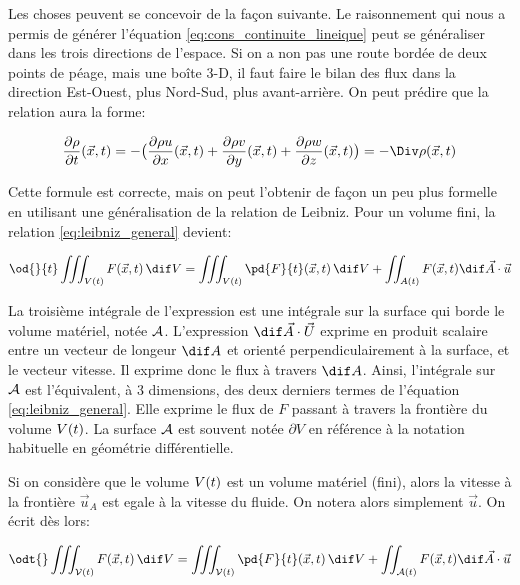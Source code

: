 Les choses peuvent se concevoir de la façon suivante. Le raisonnement qui nous a permis de générer l'équation \eqref{eq:cons_continuite_lineique} peut se généraliser dans les trois directions de l'espace. Si on a non pas une route bordée de deux points de péage, mais une boîte 3-D, il faut faire le bilan des flux dans la direction Est-Ouest, plus Nord-Sud, plus avant-arrière. On peut prédire que la relation aura la forme: 

\begin{equation}
\frac{\partial \rho}{\partial t}(\vec{x},t)
= - \big(\frac{\partial \rho u}{\partial x}(\vec{x},t)
 + \frac{\partial \rho v}{\partial y}(\vec{x},t) 
 + \frac{\partial \rho w}{\partial z}(\vec{x},t)\bigr) =
- \Div \rho (\vec{x},t)
\label{eq:cons_continuite_3D}
\end{equation}

Cette formule est correcte, mais on peut l'obtenir de façon un peu plus formelle en utilisant une généralisation de la relation de Leibniz. Pour un volume fini, la relation \eqref{eq:leibniz_general} devient: 

\begin{equation}
  \od{}{t}
  \iiint_{\Vol(t)} F(\vec{x},t)\,\dif V = 
  \iiint_{\Vol(t)} \pd{F}{t}(\vec{x},t)\,\dif V +
  \iint_{A(t)} F(\vec{x},t) \dif \vec{A} \cdot \vec{u}
  \label{eq:leibniz3d}
\end{equation}
  
La troisième intégrale de l'expression est une intégrale sur la surface qui borde le volume matériel, notée $\mathcal{A}$. 
L'expression $\dif\vec{A}\cdot\vec{U}$ exprime en produit scalaire entre un vecteur de longeur $\dif A$ et orienté perpendiculairement à la surface, et le vecteur vitesse. Il exprime donc le flux à travers $\dif A$. 
Ainsi, l'intégrale sur $\mathcal{A}$ est l'équivalent, à 3 dimensions,  des deux derniers termes de  l'équation \eqref{eq:leibniz_general}. Elle exprime le flux de $F$ passant à travers la frontière du volume $V(t)$. La surface $\mathcal{A}$ est souvent notée $\partial V$ en référence à la notation habituelle en géométrie différentielle. 

Si on considère que le volume $V(t)$ est un volume matériel (fini), alors la vitesse à la frontière $\vec{u}_A$ est egale à la vitesse du fluide. On notera alors simplement $\vec{u}$. On écrit dès lors: 

\begin{equation}
  \odt{}
  \iiint_{\vol(t)} F(\vec{x},t)\,\dif V = 
  \iiint_{\vol(t)} \pd{F}{t}(\vec{x},t)\,\dif V +
  \iint_{\dvol(t)} F(\vec{x},t) \dif \vec{A} \cdot \vec{u}
  \label{eq:reynolds}
\end{equation}

